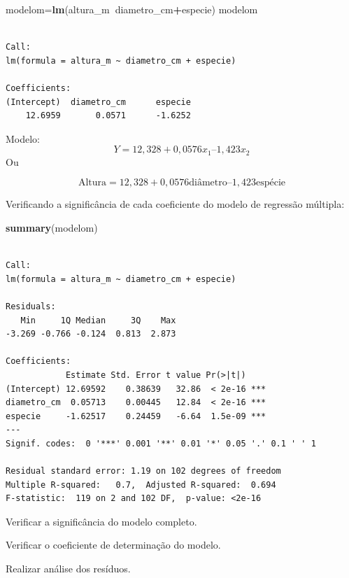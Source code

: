 \documentclass[12pt,brazil,oneside]{book}
\newenvironment{Shaded}{\begin{snugshade}}{\end{snugshade}}
\newcommand{\KeywordTok}[1]{\textcolor[rgb]{0.13,0.29,0.53}{\textbf{#1}}}
\newcommand{\NormalTok}[1]{#1}
\newcommand{\OperatorTok}[1]{\textcolor[rgb]{0.81,0.36,0.00}{\textbf{#1}}}
\begin{document}
\begin{Shaded}
\begin{Highlighting}[]
\NormalTok{modelom=}\KeywordTok{lm}\NormalTok{(altura_m}\OperatorTok{~}\NormalTok{diametro_cm}\OperatorTok{+}\NormalTok{especie) }
\NormalTok{modelom}
\end{Highlighting}
\end{Shaded}

\begin{verbatim}

Call:
lm(formula = altura_m ~ diametro_cm + especie)

Coefficients:
(Intercept)  diametro_cm      especie  
    12.6959       0.0571      -1.6252  
\end{verbatim}

Modelo:
\[
Y = 12,328 + 0,0576 x_1 – 1,423 x_2
\]
Ou

\[
\text{Altura} = 12,328 + 0,0576\text{diâmetro} – 1,423\text{espécie}
\]

Verificando a significância de cada coeficiente do modelo de regressão múltipla:

\begin{Shaded}
\begin{Highlighting}[]
\KeywordTok{summary}\NormalTok{(modelom)}
\end{Highlighting}
\end{Shaded}

\begin{verbatim}

Call:
lm(formula = altura_m ~ diametro_cm + especie)

Residuals:
   Min     1Q Median     3Q    Max 
-3.269 -0.766 -0.124  0.813  2.873 

Coefficients:
            Estimate Std. Error t value Pr(>|t|)    
(Intercept) 12.69592    0.38639   32.86  < 2e-16 ***
diametro_cm  0.05713    0.00445   12.84  < 2e-16 ***
especie     -1.62517    0.24459   -6.64  1.5e-09 ***
---
Signif. codes:  0 '***' 0.001 '**' 0.01 '*' 0.05 '.' 0.1 ' ' 1

Residual standard error: 1.19 on 102 degrees of freedom
Multiple R-squared:   0.7,  Adjusted R-squared:  0.694 
F-statistic:  119 on 2 and 102 DF,  p-value: <2e-16
\end{verbatim}

Verificar a significância do modelo completo.

Verificar o coeficiente de determinação do modelo.

Realizar análise dos resíduos.
\end{document}

